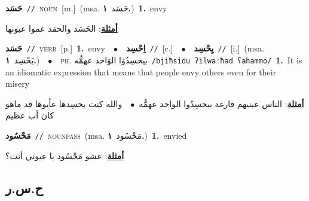 \documentclass[10pt,a4paper,twoside]{article} %
\begin{document}
\begin{multicols}{2}
{\setlength\topsep{0pt}\textbf{\foreignlanguage{arabic}{حَسَد}}\ {\color{gray}\texttt{//}\color{black}}\ \textsc{noun}\ [m.]\ \color{gray}(msa. \foreignlanguage{arabic}{حَسَد}~\foreignlanguage{arabic}{\textbf{١.}})\color{black}\ \textbf{1.}~envy\  \begin{flushright}\color{gray}\foreignlanguage{arabic}{\textbf{\underline{\foreignlanguage{arabic}{أمثلة}}}: الحَسَد والحقد عموا عيونها}\end{flushright}\color{black}} \vspace{2mm}

{\setlength\topsep{0pt}\textbf{\foreignlanguage{arabic}{حَسَد}}\ {\color{gray}\texttt{//}\color{black}}\ \textsc{verb}\ [p.]\ \textbf{1.}~envy\ \ $\bullet$\ \ \setlength\topsep{0pt}\textbf{\foreignlanguage{arabic}{اِحْسِد}}\ {\color{gray}\texttt{//}\color{black}}\ [c.]\ \ $\bullet$\ \ \setlength\topsep{0pt}\textbf{\foreignlanguage{arabic}{يِحْسِد}}\ {\color{gray}\texttt{//}\color{black}}\ [i.]\ \color{gray}(msa. \foreignlanguage{arabic}{يَحْسِد}~\foreignlanguage{arabic}{\textbf{١.}})\color{black}\ \ $\bullet$\ \ \textsc{ph.} \color{gray} \foreignlanguage{arabic}{بيحسِدُوَا الوَاحد عهمُّه}\color{black}\ {\color{gray}\texttt{/{\sffamily bjiħsidu ʔilwaːħad ʕahammo}/}\color{black}}\ \textbf{1.}~It is an idiomatic expression that means that people envy others even for their misery\  \begin{flushright}\color{gray}\foreignlanguage{arabic}{\textbf{\underline{\foreignlanguage{arabic}{أمثلة}}}: الناس عينيهم فارغة بيحسِدُوا الواحد عهمُّه\ $\bullet$\ \  والله كنت بحسِدها عأبوها قد ماهو كان أب عظيم}\end{flushright}\color{black}} \vspace{2mm}

{\setlength\topsep{0pt}\textbf{\foreignlanguage{arabic}{مَحْسُود}}\ {\color{gray}\texttt{//}\color{black}}\ \textsc{noun\textunderscore pass}\ \color{gray}(msa. \foreignlanguage{arabic}{مَحْسُود}~\foreignlanguage{arabic}{\textbf{١.}})\color{black}\ \textbf{1.}~envied\  \begin{flushright}\color{gray}\foreignlanguage{arabic}{\textbf{\underline{\foreignlanguage{arabic}{أمثلة}}}: عشو مَحْسُود يا عيوني أنت؟}\end{flushright}\color{black}} \vspace{2mm}

\vspace{-3mm}
\subsection*{\color{blue}\foreignlanguage{arabic}{ح.س.ر}\color{blue}{}} 


\end{multicols}
\end{document}
